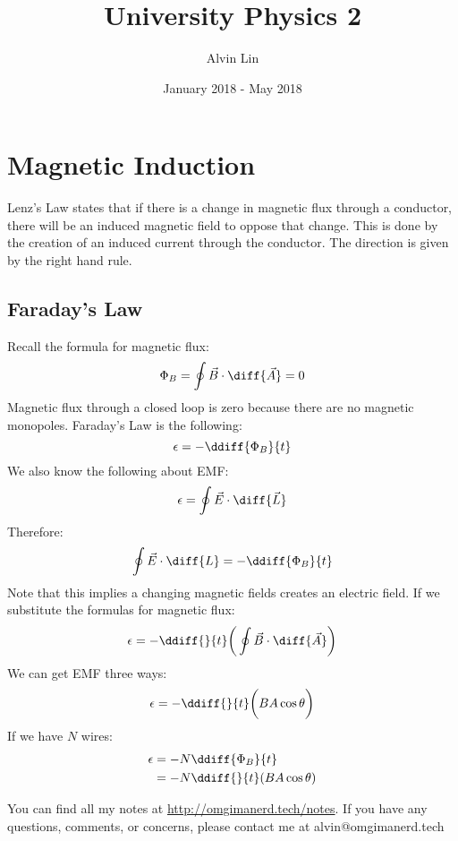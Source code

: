 \documentclass{math}
\title{University Physics 2}
\author{Alvin Lin}
\date{January 2018 - May 2018}
\begin{document}
\maketitle

\section*{Magnetic Induction}
Lenz's Law states that if there is a change in magnetic flux through a
conductor, there will be an induced magnetic field to oppose that change. This
is done by the creation of an induced current through the conductor. The
direction is given by the right hand rule.

\subsection*{Faraday's Law}
Recall the formula for magnetic flux:
\[ \Phi_B = \oint\vec{B}\cdot\diff{\vec{A}} = 0 \]
Magnetic flux through a closed loop is zero because there are no magnetic
monopoles. Faraday's Law is the following:
\[ \epsilon = -\ddiff{\Phi_B}{t} \]
We also know the following about EMF:
\[ \epsilon = \oint\vec{E}\cdot\diff{\vec{L}} \]
Therefore:
\[ \oint\vec{E}\cdot\diff{L} = -\ddiff{\Phi_B}{t} \]
Note that this implies a changing magnetic fields creates an electric field.
If we substitute the formulas for magnetic flux:
\[ \epsilon = -\ddiff{}{t}\bigg(\oint\vec{B}\cdot\diff{\vec{A}}\bigg) \]
We can get EMF three ways:
\[ \epsilon = -\ddiff{}{t}\bigg(BA\cos\theta\bigg) \]
If we have \( N \) wires:
\begin{align*}
  \epsilon &= -N\ddiff{\Phi_B}{t} \\
  &= -N\ddiff{}{t}(BA\cos\theta)
\end{align*}

\begin{center}
  You can find all my notes at \url{http://omgimanerd.tech/notes}. If you have
  any questions, comments, or concerns, please contact me at
  alvin@omgimanerd.tech
\end{center}
\end{document}
